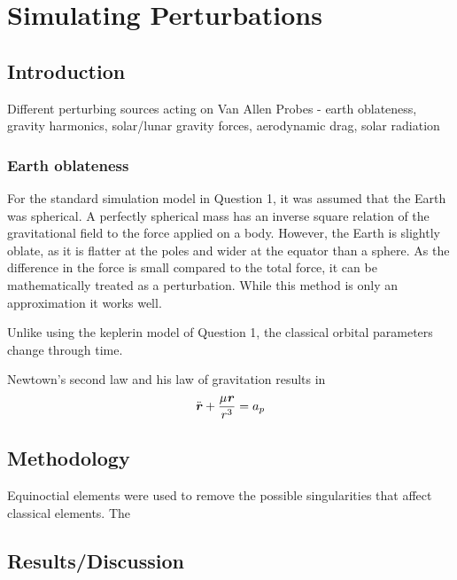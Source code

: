 \documentclass[Space3_Assign1.tex]{subfiles}
\begin{document}
\section{Simulating Perturbations}

\subsection{Introduction}
Different perturbing sources acting on Van Allen Probes - earth oblateness, gravity harmonics, solar/lunar gravity forces, aerodynamic drag, solar radiation\\

\subsubsection{Earth oblateness}
For the standard simulation model in Question 1, it was assumed that the Earth was spherical. A perfectly spherical mass has an inverse square relation of the gravitational field to the force applied on a body. However, the Earth is slightly oblate, as it is flatter at the poles and wider at the equator than a sphere. As the difference in the force is small compared to the total force, it can be mathematically treated as a perturbation. While this method is only an approximation it works well.

Unlike using the keplerin model of Question 1, the classical orbital parameters change through time.


Newtown's second law and his law of gravitation results in 
\begin{eqnarray}
\ddot{\textbf{\textit{r}}}+\frac{\mu\textbf{\textit{r}}}{r^3} = a_p
\end{eqnarray}

\subsection{Methodology}
Equinoctial elements were used to remove the possible singularities that affect classical elements. The 



\subsection{Results/Discussion}
\end{document}
